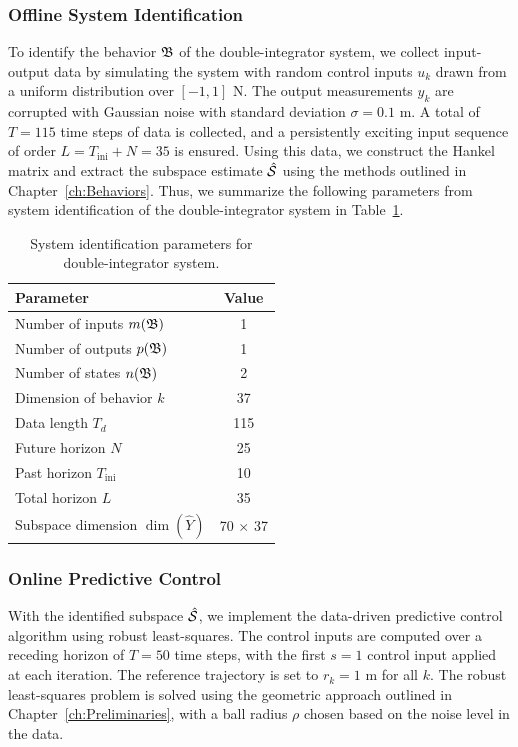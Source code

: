 \subsubsection{Offline System Identification}
To identify the behavior $\mathfrak{B}$ of the double-integrator system, we collect input-output data by simulating the system with random control inputs $u_k$ drawn from a uniform distribution over $[-1, 1]$ N. The output measurements $y_k$ are corrupted with Gaussian noise with standard deviation $\sigma = 0.1$ m. A total of $T = 115$ time steps of data is collected, and a persistently exciting input sequence of order $L = T_{\textrm{ini}}+N = 35$ is ensured. Using this data, we construct the Hankel matrix and extract the subspace estimate $\hat{\mathcal{S}}$ using the methods outlined in Chapter~\ref{ch:Behaviors}. Thus, we summarize the following parameters from system identification of the double-integrator system in Table~\ref{tab:sysid_params_double_integrator}.
\begin{table}[h]
    \centering
    \begin{tabular}{l|c}
        \textbf{Parameter} & \textbf{Value} \\
        \hline 
        \hline
        Number of inputs $m(\mathfrak{B})$ & 1 \\
        Number of outputs $p(\mathfrak{B})$ & 1 \\
        Number of states $n(\mathfrak{B})$ & 2 \\
        Dimension of behavior $k$ & 37 \\
        Data length $T_d$ & 115 \\
        Future horizon $N$ & 25 \\
        Past horizon $T_{\textrm{ini}}$ & 10 \\
        Total horizon $L$ & 35 \\
        Subspace dimension $\dim(\hat{Y})$ & 70 $\times$ 37 \\
        \hline
    \end{tabular}
    \caption{System identification parameters for double-integrator system.}
    \label{tab:sysid_params_double_integrator}
\end{table}

\subsubsection{Online Predictive Control}
With the identified subspace $\hat{\mathcal{S}}$, we implement the data-driven predictive control algorithm using robust least-squares. The control inputs are computed over a receding horizon of $T = 50$ time steps, with the first $s = 1$ control input applied at each iteration. The reference trajectory is set to $r_k = 1$ m for all $k$. The robust least-squares problem is solved using the geometric approach outlined in Chapter~\ref{ch:Preliminaries}, with a ball radius $\rho$ chosen based on the noise level in the data.

